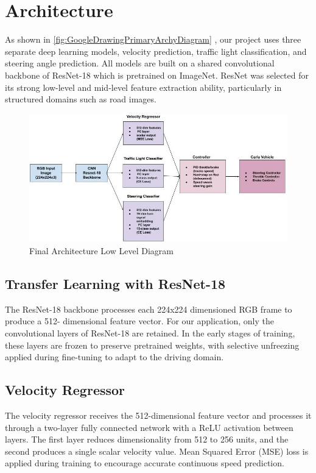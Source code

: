 \documentclass{article} %
\begin{document}
\section{Architecture}

As shown in \autoref{fig:GoogleDrawingPrimaryArchyDiagram} , our project uses three separate deep learning models, velocity prediction, traffic light classification, and steering angle prediction.
All models are built on a shared convolutional backbone of ResNet-18 which is pretrained on ImageNet. ResNet was selected for its strong low-level and mid-level feature extraction ability, particularly in structured domains such as road images.

\begin{figure}[H] %
    \centering
    \includegraphics[width=1.0\textwidth]{GoogleDrawingPrimaryArchyDiagram.jpg} %
    \caption{Final Architecture Low Level Diagram}
    \label{fig:GoogleDrawingPrimaryArchyDiagram}
\end{figure}

\subsection{Transfer Learning with ResNet-18}

The ResNet-18 backbone processes each 224x224 dimensioned RGB frame to produce a 512- dimensional feature vector.
For our application, only the convolutional layers of ResNet-18 are retained. In the early stages of training, these layers are frozen to preserve pretrained weights, with selective unfreezing applied during fine-tuning to adapt to the driving domain.

\subsection{Velocity Regressor}
The velocity regressor receives the 512-dimensional feature vector and processes it through a two-layer fully connected network with a ReLU activation between layers.
The first layer reduces dimensionality from 512 to 256 units, and the second produces a single scalar velocity value. Mean Squared Error (MSE)
loss is applied during training to encourage accurate continuous speed prediction.
\end{document}
